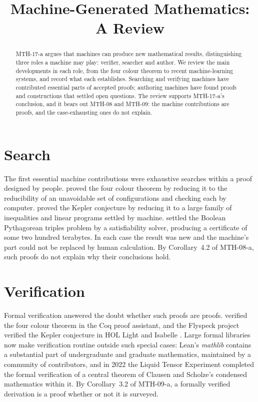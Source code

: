 \documentclass{situationist-preprint}
\title{Machine-Generated Mathematics: A Review}
\begin{document}
\maketitle

\begin{abstract}
MTH-17-a argues that machines can produce new mathematical results, distinguishing three roles a machine may play: verifier, searcher and author. We review the main developments in each role, from the four colour theorem to recent machine-learning systems, and record what each establishes. Searching and verifying machines have contributed essential parts of accepted proofs; authoring machines have found proofs and constructions that settled open questions. The review supports MTH-17-a's conclusion, and it bears out MTH-08 and MTH-09: the machine contributions are proofs, and the case-exhausting ones do not explain.
\end{abstract}

\section{Search}

The first essential machine contributions were exhaustive searches within a proof designed by people. \citet{AppelHaken1977} proved the four colour theorem by reducing it to the reducibility of an unavoidable set of configurations and checking each by computer. \citet{Hales2005} proved the Kepler conjecture by reducing it to a large family of inequalities and linear programs settled by machine. \citet{HeuleEtAl2016} settled the Boolean Pythagorean triples problem by a satisfiability solver, producing a certificate of some two hundred terabytes. In each case the result was new and the machine's part could not be replaced by human calculation. By Corollary~4.2 of MTH-08-a, such proofs do not explain why their conclusions hold.

\section{Verification}

Formal verification answered the doubt whether such proofs are proofs. \citet{Gonthier2008} verified the four colour theorem in the Coq proof assistant, and the Flyspeck project verified the Kepler conjecture in HOL Light and Isabelle \citep{HalesEtAl2017}. Large formal libraries now make verification routine outside such special cases: Lean's \emph{mathlib} \citep{mathlib2020} contains a substantial part of undergraduate and graduate mathematics, maintained by a community of contributors, and in 2022 the Liquid Tensor Experiment completed the formal verification of a central theorem of Clausen and Scholze's condensed mathematics within it. By Corollary~3.2 of MTH-09-a, a formally verified derivation is a proof whether or not it is surveyed.
\end{document}
